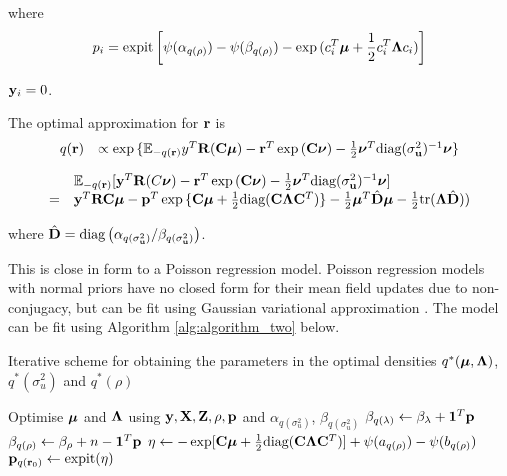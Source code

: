 \documentclass{article}[12pt]
\begin{document}
\noindent where
$$
p_i = \text{expit} \left[ \psi{(\alpha_{q(\rho)})} - \psi{(\beta_{q(\rho)})} - \exp{(c_i^T{\boldsymbol\mu}+ {\frac{1}{2}}c_i^T {\boldsymbol\Lambda}c_i)} \right]
$$

\noindent {} ${\bf y}_i = 0$.



\noindent The optimal approximation for ${\bf r}$ is
$$
\begin{array}{rl}
q({\bf r}) &\propto \exp{\{{\mathbb E}_{-q({\bf r})}y^T{\bf R}({\bf C}{\boldsymbol\mu}) - {\bf r}^T\exp{({\bf C}{\boldsymbol\nu})}-{\frac{1}{2}}{\boldsymbol\nu}^T \text{diag}(\sigma_{{\bf u}}^2)^{-1} {\boldsymbol\nu}\}}
\end{array}
$$

$$
\begin{array}{rl}
&{\mathbb E}_{-q({\bf r})} [{\bf y}^T{\bf R}(C{\boldsymbol \nu}) - {\bf r}^T\exp{({\bf C}{\boldsymbol\nu})}-{\frac{1}{2}} {\boldsymbol \nu}^T \text{diag}(\sigma_{{\bf u}}^2)^{-1} {\boldsymbol \nu}]\\
=&{\bf y}^T{\bf R}{\bf C} {\boldsymbol \mu} - {\bf p}^T \exp{\{{\bf C}{\boldsymbol\mu}+ {\frac{1}{2}}\text{diag}({\bf C}{\boldsymbol\Lambda}{\bf C}^T)\}} - {\frac{1}{2}} {\boldsymbol \mu}^T \hat{{\bf D}} {\boldsymbol \mu} - {\frac{1}{2}} \text{tr}({\boldsymbol \Lambda} \hat{{\bf D}} ))
\end{array}
$$

\noindent where $\hat{{\bf D}} = \text{diag}\left (\alpha_{q(\sigma_{{\bf u}}^2)}/\beta_{q(\sigma_{{\bf u}}^2)} \right )$. 

\noindent This is close in form to a Poisson regression model. Poisson regression models
with normal priors have no closed form for their mean field updates due to
non-conjugacy, but can be fit using Gaussian variational approximation
\citep{ormerod09}. The model can be fit using Algorithm \ref{alg:algorithm_two} below.

\begin{algorithm}\label{alg:algorithm_two}
\label{algorithm2}
\caption[Algorithm 2]{Iterative scheme for obtaining the parameters in the
optimal densities $q^*({\boldsymbol \mu}, {\boldsymbol \Lambda})$, $q^*(\sigma_u^2)$ and $q^*(\rho)$}
\begin{algorithmic}
\STATE Optimise ${\boldsymbol \mu}$ and ${\boldsymbol \Lambda}$ using ${\bf y}, {\bf X}, {\bf Z}, \rho, {\bf p}$ and
$\alpha_{q(\sigma_u^2)}$, $\beta_{q(\sigma_u^2)}$
\STATE $\beta_{q(\lambda)} \leftarrow \beta_\lambda + {\bf 1}^T{\bf p}$
\STATE $\beta_{q(\rho)} \leftarrow \beta_\rho + n - {\bf 1}^T{\bf p}$
\STATE $\eta \leftarrow -\exp [{\bf C} {\boldsymbol \mu} + {\frac{1}{2}} \text{diag}{({\bf C}{\boldsymbol\Lambda}{\bf C}^T)}] + \psi{(a_{q{(\rho)}})} - \psi{(b_{q{(\rho)}})}$
\STATE ${\bf p}_{q({\bf r}_0)} \leftarrow \text{expit} (\eta)$
\ENDWHILE
\end{algorithmic}
\end{algorithm}
\end{document}
